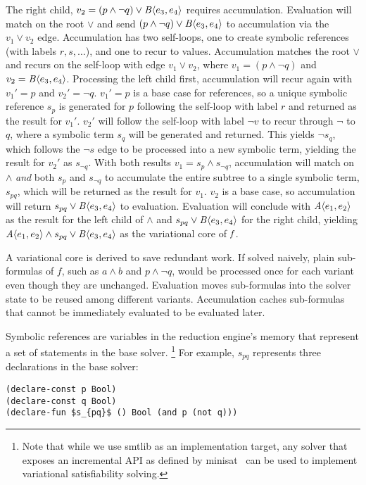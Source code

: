 The right child, $v_2=(p\wedge \neg q) \vee \chc[B]{e_3, e_4}$ requires
accumulation. Evaluation will match on the root $\vee$ and send $(p\wedge \neg
q) \vee \chc[B]{e_3, e_4}$ to accumulation via the $v_{1} \vee v_{2}$ edge.
Accumulation has two self-loops, one to create symbolic references (with labels
$r, s, \hdots$), and one to recur to values. Accumulation matches the root
$\vee$ and recurs on the self-loop with edge $v_{1} \vee v_{2}$, where $v_{1} =
(p\wedge \neg q)$ and $v_{2} = \chc[B]{e_3, e_4}$. Processing the left child
first, accumulation will recur again with $v_{1}' = p$ and $v_{2}' = \neg q$.
$v_{1}' = p$ is a base case for references, so a unique symbolic reference
$s_{p}$ is generated for $p$ following the self-loop with label $r$ and
returned as the result for $v_{1}'$. $v_{2}'$ will follow the self-loop with
label $\neg v$ to recur through $\neg$ to $q$, where a symbolic term $s_{q}$
will be generated and returned. This yields $\neg s_{q}$, which follows the
$\neg s$ edge to be processed into a new symbolic term, yielding the result for
$v_{2}'$ as $s_{\neg q}$. With both results $v_{1} = s_{p}\wedge s_{\neg q}$,
accumulation will match on $\wedge$ \emph{and} both $s_{p}$ and $s_{\neg q}$ to
accumulate the entire subtree to a single symbolic term, $s_{pq}$, which will
be returned as the result for $v_{1}$. $v_{2}$ is a base case, so accumulation
will return $s_{pq} \vee \chc[B]{e_3, e_4}$ to evaluation. Evaluation will
conclude with $\chc[A]{e_1,e_2}$ as the result for the left child of $\wedge$
and $s_{pq} \vee \chc[B]{e_3, e_4}$ for the right child, yielding
$\chc[A]{e_1,e_2} \wedge s_{pq} \vee \chc[B]{e_3, e_4}$ as the variational core
of $\mathit{f}$.

A variational core is derived to save redundant work.
%
If solved naively, plain sub-formulas of $f$, such as $a \wedge b$ and $p
\wedge \neg q$, would be processed once for each variant even though they are
unchanged. Evaluation moves sub-formulas into the solver state to be reused
among different variants. Accumulation caches sub-formulas that cannot be
immediately evaluated to be evaluated later.


Symbolic references are variables in the reduction engine's memory that
represent a set of statements in the base solver.%
%
\footnote{Note that while we use \acl{smtlib} as an implementation target, any
  solver that exposes an incremental API as defined by
  minisat~\cite{10.1007/978-3-319-09284-3_16} can be used to implement
  variational satisfiability solving.}
%
For example, $s_{pq}$ represents three declarations in the base solver:
%
\begin{lstlisting}[columns=flexible,keepspaces=true,language=SMTLIB]
(declare-const p Bool)
(declare-const q Bool)
(declare-fun $s_{pq}$ () Bool (and p (not q)))
\end{lstlisting}

